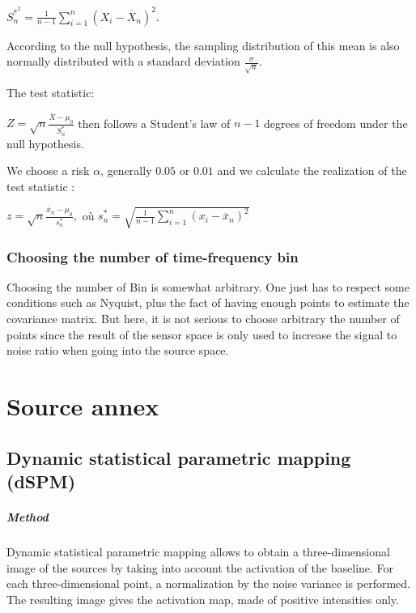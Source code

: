 $S^{\ast ^2}_n = \frac{1}{n-1}\sum\limits_{i=1}^n (X_i - \overline X_n )^2$.

According to the null hypothesis, the sampling distribution of this mean is also normally distributed with a standard deviation $\frac{\sigma}{\sqrt{n}}$.

The test statistic:

$ Z = \sqrt{n}\frac{\overline{X} - \mu_0}{S^{\ast}_n}$
then follows a Student's law of $n-1$ degrees of freedom under the null hypothesis.

We choose a risk $\alpha$, generally $0.05$ or $0.01$ and we calculate the realization of the test statistic :

$z = \sqrt{n}\frac{\overline{x}_n - \mu_0}{s^{\ast}_n},$ où $s^{\ast}_n =\sqrt{\frac{1}{n-1}\sum\limits_{i=1}^n (x_i - \overline x_n )^2} $

\subsection{Choosing the number of time-frequency bin}

Choosing the number of Bin is somewhat arbitrary. One just has to respect some conditions such as Nyquist, plus the fact of having enough points to estimate the covariance matrix. But here, it is not serious to choose arbitrary the number of points since the result of the sensor space is only used to increase the signal to noise ratio when going into the source space.

\chapter{Source annex}


\section{Dynamic statistical parametric mapping (dSPM)}

\paragraph{Method}

Dynamic statistical parametric mapping allows to obtain a three-dimensional image of the sources by taking into account the activation of the baseline. For each three-dimensional point, a normalization by the noise variance is performed. The resulting image gives the activation map, made of positive intensities only.

